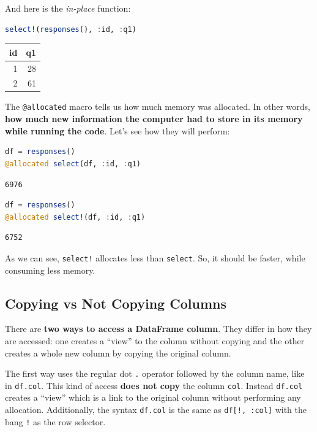 \documentclass[
  notoc %
]{tufte-book}
\newcommand{\passthrough}[1]{#1}
\begin{document}
And here is the \emph{in-place} function:

\begin{lstlisting}[language=Julia]
select!(responses(), :id, :q1)
\end{lstlisting}

\begin{longtable}[]{@{}rr@{}}
\toprule
id & q1 \\
\midrule
\endhead
1 & 28 \\
2 & 61 \\
\bottomrule
\end{longtable}

The \passthrough{\lstinline!@allocated!} macro tells us how much memory
was allocated. In other words, \textbf{how much new information the
computer had to store in its memory while running the code}. Let's see
how they will perform:

\begin{lstlisting}[language=Julia]
df = responses()
@allocated select(df, :id, :q1)
\end{lstlisting}

\begin{lstlisting}
6976
\end{lstlisting}

\begin{lstlisting}[language=Julia]
df = responses()
@allocated select!(df, :id, :q1)
\end{lstlisting}

\begin{lstlisting}
6752
\end{lstlisting}

As we can see, \passthrough{\lstinline"select!"} allocates less than
\passthrough{\lstinline!select!}. So, it should be faster, while
consuming less memory.

\hypertarget{sec:df_performance_df_copy}{%
\subsection{Copying vs Not Copying
Columns}\label{sec:df_performance_df_copy}}

There are \textbf{two ways to access a DataFrame column}. They differ in
how they are accessed: one creates a ``view'' to the column without
copying and the other creates a whole new column by copying the original
column.

The first way uses the regular dot \passthrough{\lstinline!.!} operator
followed by the column name, like in \passthrough{\lstinline!df.col!}.
This kind of access \textbf{does not copy} the column
\passthrough{\lstinline!col!}. Instead \passthrough{\lstinline!df.col!}
creates a ``view'' which is a link to the original column without
performing any allocation. Additionally, the syntax
\passthrough{\lstinline!df.col!} is the same as
\passthrough{\lstinline"df[!, :col]"} with the bang
\passthrough{\lstinline"!"} as the row selector.
\end{document}

